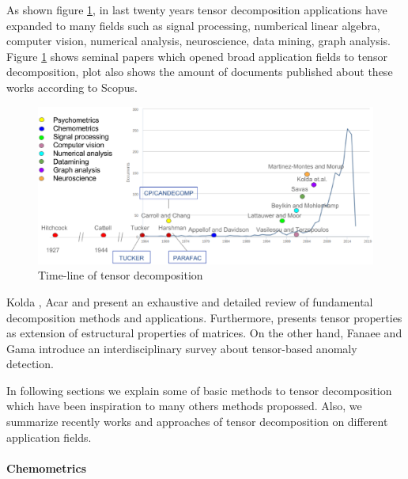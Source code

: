 \documentclass[letterpaper,12pt]{article}
\begin{document}
As shown figure \ref{fig:applications}, in last twenty years tensor decomposition applications have expanded to many fields such as signal processing, numberical linear algebra, computer vision, numerical analysis, neuroscience, data mining, graph analysis. Figure \ref{fig:applications} shows seminal papers which opened broad application fields to tensor decomposition, plot also shows the amount of documents published about these works according to Scopus.

\begin{figure}[!ht]
\centering
 \includegraphics[scale=0.5]{Images/time-line.eps}
 \caption{Time-line of tensor decomposition}\label{fig:applications}
\end{figure}




Kolda \cite{Kolda2009}, Acar \cite{Acar2009} and \cite{Comon2014} present an exhaustive and detailed review of fundamental decomposition methods and applications. Furthermore, \cite{Dartois2016} presents tensor properties as extension of estructural properties of matrices. On the other hand, Fanaee and Gama \cite{Fanaee-T2016} introduce an interdisciplinary survey about tensor-based anomaly detection.

In following sections we explain some of basic methods to tensor decomposition which have been inspiration to many others methods propossed. Also, we summarize recently  works and approaches of tensor decomposition on different application fields.

\paragraph{Chemometrics}
\end{document}
